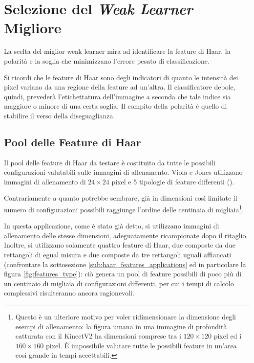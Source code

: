     \section{Selezione del \emph{Weak Learner} Migliore}
    \label{sec:weak_learner}
        La scelta del miglior weak learner mira ad identificare la feature di Haar, la polarità e la soglia che minimizzano l'errore pesato di classificazione.

        Si ricordi che le feature di Haar sono degli indicatori di quanto le intensità dei pixel variano da una regione della feature ad un'altra. 
        Il classificatore debole, quindi, prevederà l'etichettatura dell'immagine a seconda che tale indice sia maggiore o minore di una certa soglia. 
        Il compito della polarità è quello di stabilire il verso della diseguaglianza.

        \subsection{Pool delle Feature di Haar} %
        \label{sub:features_pool}
            Il pool delle feature di Haar da testare è costituito da tutte le possibili configurazioni valutabili sulle immagini di allenamento.
            Viola e Jones utilizzano immagini di allenamento di $24 \times 24$ pixel e 5 tipologie di feature differenti (\cite[sezione 2.2]{Viola04}).

            Contrariamente a quanto potrebbe sembrare, già in dimensioni così limitate il numero di configurazioni possibili raggiunge l'ordine delle centinaia di migliaia\footnote{Questo è un ulteriore motivo per voler ridimensionare la dimensione degli esempi di allenamento: la figura umana in una immagine di profondità catturata con il KinectV2 ha dimensioni comprese tra i $120 \times 120$ pixel ed i $160 \times 160$ pixel. È impossibile valutare tutte le possibili feature in un'area così grande in tempi accettabili.}.

            In questa applicazione, come è stato già detto, si utilizzano immagini di allenamento delle stesse dimensioni, adeguatamente ricampionate dopo il ritaglio.
            Inoltre, si utilizzano solamente quattro feature di Haar, due composte da due rettangoli di egual misura e due composte da tre rettangoli uguali affiancati (confrontare la sottosezione \ref{sub:haar_features_applications} ed in particolare la figura \ref{fig:features_type}): ciò genera un pool di feature possibili di poco più di un centinaio di migliaia di configurazioni differenti, per cui i tempi di calcolo complessivi risulteranno ancora ragionevoli.

